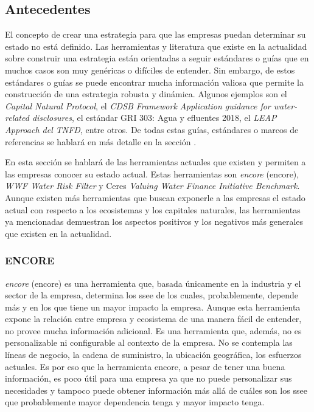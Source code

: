 \subsection{Antecedentes} \label{subsec:antecedentes}
El concepto de crear una estrategia para que las empresas puedan determinar su estado no está definido. Las herramientas y literatura que existe en la actualidad sobre construir una estrategia están orientadas a seguir estándares o guías que en muchos casos son muy genéricas o difíciles de entender. Sin embargo, de estos estándares o guías se puede encontrar mucha información valiosa que permite la construcción de una estrategia robusta y dinámica.  Algunos ejemplos son el \textit{Capital Natural Protocol}, el \textit{CDSB Framework Application guidance for water-related disclosures}, el estándar GRI 303: Agua y efluentes 2018, el \textit{LEAP Approach del TNFD}, entre otros. De todas estas guías, estándares o marcos de referencias se hablará en más detalle en la sección .

\hfill

En esta sección se hablará de las herramientas actuales que existen y permiten a las empresas conocer su estado actual. Estas herramientas son \textit{\acrlong{encore}} (\acrshort{encore}), \textit{WWF Water Risk Filter} y Ceres \textit{Valuing Water Finance Initiative Benchmark}. Aunque existen más herramientas que buscan exponerle a las empresas el estado actual con respecto a los ecosistemas y los capitales naturales, las herramientas ya mencionadas demuestran los aspectos positivos y los negativos más generales que existen en la actualidad.

\subsubsection{ENCORE} \label{subsubsec:encore}
\textit{\acrlong{encore}} (\acrshort{encore}) es una herramienta que, basada únicamente en la industria y el sector de la empresa, determina los \acrshort{ssee} de los cuales, probablemente, depende más y en los que tiene un mayor impacto la empresa. Aunque esta herramienta expone la relación entre empresa y ecosistema de una manera fácil de entender, no provee mucha información adicional. Es una herramienta que, además, no es personalizable ni configurable al contexto de la empresa. No se contempla las líneas de negocio, la cadena de suministro, la ubicación geográfica, los esfuerzos actuales. Es por eso que la herramienta \acrshort{encore}, a pesar de tener una buena información, es poco útil para una empresa ya que no puede personalizar sus necesidades y tampoco puede obtener información más allá de cuáles son los \acrshort{ssee} que probablemente mayor dependencia tenga y mayor impacto tenga. 



